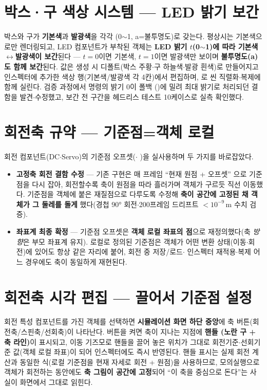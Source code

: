 \section{박스·구 색상 시스템 --- LED 밝기 보간}
박스와 구가 \textbf{기본색}과 \textbf{발광색}을 각각 \code{[r,g,b,a]}(0$\sim$1,
a=불투명도)로 갖는다. 평상시는 기본색으로만 렌더링되고, LED 컴포넌트가 부착된 객체는
\textbf{LED 밝기 $t$(0$\sim$1)에 따라 기본색$\leftrightarrow$발광색이 보간}된다 ---
$t{=}0$이면 기본색, $t{=}1$이면 발광색만 보이며 \textbf{불투명도(a)도 함께 보간}된다.
값은 생성 시 디폴트(박스 주황$\cdot$구 하늘색$\cdot$발광 흰색)로 만들어지고 인스펙터에
추가한 색상 행(기본색/발광색 각 4칸)에서 편집하며, 로 씬
직렬화$\cdot$복제에 함께 실린다. 검증 과정에서  명령의 밝기 0이 폴백
()에 밀려 최대 밝기로 처리되던 결함을 발견$\cdot$수정했고, 보간 전 구간을
헤드리스 테스트 10케이스로 실측 확인했다.

\section{회전축 규약 --- 기준점=객체 로컬}
회전 컴포넌트(DC$\cdot$Servo)의 기준점 오프셋($\cdot$%
)을 실사용하며 두 가지를 바로잡았다.
\begin{itemize}
  \item \textbf{고정축 회전 결함 수정} --- 기존 구현은 매 프레임 ``현재 원점 + 오프셋''
  으로 기준점을 다시 잡아, 회전할수록 축이 원점을 따라 흘러가며 객체가 구르듯 직선
  이동했다. 기준점을 객체에 붙은 재질점으로 다루도록 수정해 \textbf{축이 공간에 고정된
  채 객체가 그 둘레를 돌게} 했다(경첩 90° 회전$\cdot$200프레임 드리프트 $<10^{-9}$\,m
  수치 검증).
  \item \textbf{좌표계 최종 확정} --- 기준점 오프셋은 \textbf{객체 로컬 좌표의 점}으로
  재정의했다(축 \emph{방향}은 부모 좌표계 유지). 로컬로 정의된 기준점은 객체가 어떤
  변환 상태(이동$\cdot$회전)에 있어도 항상 같은 자리에 붙어, 회전 중 저장/로드$\cdot$%
  인스펙터 재적용$\cdot$복제 어느 경우에도 축이 동일하게 재현된다.
\end{itemize}

\section{회전축 시각 편집 --- 끌어서 기준점 설정}
회전 특성 컴포넌트를 가진 객체를 선택하면 \textbf{시뮬레이션 화면 하단 중앙}에 축
버튼(회전축/스핀축/선회축)이 나타난다. 버튼을 켜면 축이 지나는 지점에 \textbf{핸들
(노란 구 + 축 라인)}이 표시되고, 이동 기즈모로 핸들을 끌어 놓은 위치가 그대로
회전기준$\cdot$선회기준 값(객체 로컬 좌표)이 되어 인스펙터에도 즉시 반영된다.
핸들 표시는 실제 회전 계산과 동일한 식(로컬 기준점을 현재 자세로 회전 + 원점)을
사용하므로, 모의실행으로 객체가 회전하는 동안에도 \textbf{축 그림이 공간에 고정}되어
``이 축을 중심으로 돈다''는 사실이 화면에서 그대로 읽힌다.

